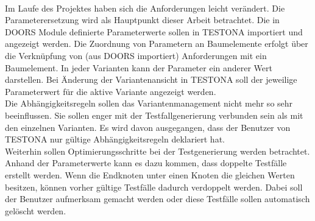 \paragraph{}

Im Laufe des Projektes haben sich die Anforderungen leicht verändert. Die Parameterersetzung wird als Hauptpunkt dieser Arbeit betrachtet. Die in DOORS Module definierte Parameterwerte sollen in TESTONA importiert und angezeigt werden. Die Zuordnung von Parametern an Baumelemente erfolgt über die Verknüpfung von (aus DOORS importiert) Anforderungen mit ein Baumelement. In jeder Varianten kann der Parameter ein anderer Wert darstellen. Bei Änderung der Variantenansicht in TESTONA soll der jeweilige Parameterwert für die aktive Variante angezeigt werden.\\


Die Abhängigkeitsregeln sollen das Variantenmanagement nicht mehr so sehr beeinflussen. Sie  sollen  enger mit der Testfallgenerierung verbunden sein als mit den einzelnen Varianten. Es wird davon ausgegangen, dass der Benutzer von TESTONA nur gültige Abhängigkeitsregeln deklariert hat.\\


Weiterhin sollen Optimierungsschritte bei der Testgenerierung werden betrachtet. Anhand der Parameterwerte kann es dazu kommen, dass doppelte Testfälle erstellt werden. Wenn die Endknoten unter einen Knoten die gleichen Werten besitzen, können vorher gültige Testfälle dadurch verdoppelt werden. Dabei soll der Benutzer aufmerksam gemacht werden oder diese Testfälle sollen automatisch gelöscht werden.